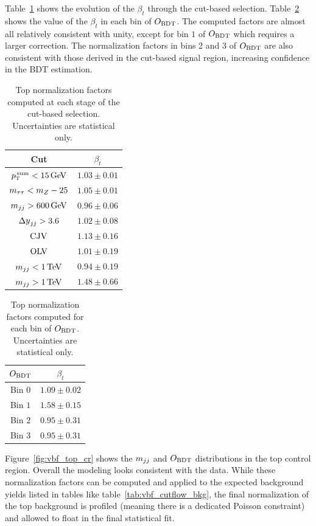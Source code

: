 Table~\ref{tab:vbf_cb_topnf} shows the evolution of the $\beta_{t}$ through the cut-based selection. Table~\ref{tab:vbf_bdt_topnf} shows the value of the $\beta_{t}$ in each bin of $O_{\rm BDT}$. The computed factors are almost all relatively consistent with unity, except for bin $1$ of $O_{\rm BDT}$ which requires a larger correction. The normalization factors in bins 2 and 3 of $O_{\rm BDT}$ are also consistent with those derived in the cut-based signal region, increasing confidence in the BDT estimation. 
%
\begin{table}[h!]
\centering
\captionsetup{justification=centering}
\begin{tabular}{|c|c|}
\hline
Cut & $\beta_t$ \\ \hline
$\pTtot < 15 \GeV$ & $1.03 \pm 0.01$ \\ \hline
$m_{\tau\tau} < m_Z - 25$ & $1.05 \pm 0.01$ \\ \hline
$\mjj > 600 \GeV$ & $0.96 \pm 0.06$ \\ \hline
$\dyjj > 3.6 $ & $1.02 \pm 0.08$ \\ \hline
$\rm CJV$ & $1.13 \pm 0.16$ \\ \hline
$\rm OLV$ & $1.01 \pm 0.19$ \\ \hline
$\mjj < 1 \TeV$ & $0.94 \pm 0.19$ \\ \hline
$\mjj > 1 \TeV$ & $1.48 \pm 0.66$ \\ \hline 
\end{tabular}
\caption{Top normalization factors computed at each stage of the cut-based selection. Uncertainties are statistical only.}
\label{tab:vbf_cb_topnf}
\end{table}
%
\begin{table}[h!]
\centering
\captionsetup{justification=centering}
\begin{tabular}{|c|c|}
\hline
$O_{\rm BDT}$ & $\beta_t$ \\ \hline
Bin $0$ & $1.09 \pm 0.02$ \\ \hline
Bin $1$ & $1.58 \pm 0.15$ \\ \hline
Bin $2$ & $0.95 \pm 0.31$ \\ \hline
Bin $3$ & $0.95 \pm 0.31$ \\ \hline
\end{tabular}
\caption{Top normalization factors computed for each bin of $O_{\rm BDT}$. Uncertainties are statistical only.}
\label{tab:vbf_bdt_topnf}
\end{table}
%
Figure~\ref{fig:vbf_top_cr} shows the $m_{jj}$ and $O_{\rm BDT}$ distributions in the top control region. Overall the modeling looks consistent with the data.
While these normalization factors can be computed and applied to the expected background yields listed in tables like table~\ref{tab:vbf_cutflow_bkg}, the final normalization of the top background is profiled (meaning there is a dedicated Poisson constraint) and allowed to float in the final statistical fit. 


